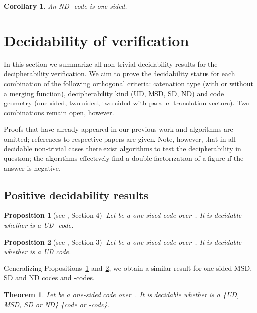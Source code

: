 \documentclass[final,nomarks]{dmtcs-episciences}
\newtheorem{theorem}{Theorem}
\newtheorem{proposition}{Proposition}
\newtheorem{corollary}{Corollary}
\begin{document}
\begin{corollary}
An ND -code is one-sided.
\end{corollary}



\section{Decidability of verification}\label{sec:dec}

In this section we summarize all non-trivial decidability
results for the decipherability verification. We aim to prove
the decidability status for each combination of the
following orthogonal criteria: catenation type (with or without
a merging function), decipherability kind (UD, MSD, SD, ND) and
code geometry (one-sided, two-sided, two-sided with parallel
translation vectors). Two combinations remain open, however.

Proofs that have already appeared in our previous work and algorithms are omitted; 
references to respective papers are given. Note,
however, that in all decidable non-trivial cases there exist
algorithms to test the decipherability in question; the
algorithms effectively find a double factorization of a figure
if the answer is negative.


\subsection{Positive decidability results}


\begin{proposition}[see \cite{KolMoc}, Section 4]\label{prop:UDm}
Let  be a one-sided code over~. It is decidable whether 
is a UD -code.
\end{proposition}

\begin{proposition}[see \cite{KolRAIRO}, Section 3]\label{prop:UD}
Let  be a one-sided code over~. It is decidable whether 
is a UD code.
\end{proposition}

Generalizing Propositions~\ref{prop:UDm} and~\ref{prop:UD}, we obtain a 
similar result for one-sided MSD, SD and ND codes and -codes.

\begin{theorem}\label{th:oneSide}
Let  be a one-sided code over~. It is decidable whether 
is a \{UD, MSD, SD or ND\} \{code or -code\}.
\end{theorem}
\end{document}
